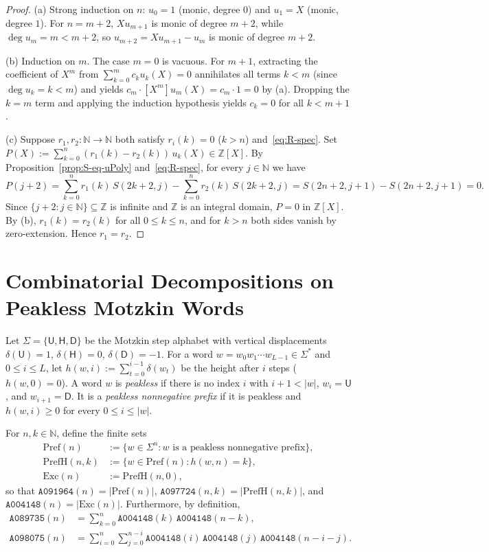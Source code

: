\documentclass[11pt]{article}
\theoremstyle{definition}
\newcommand{\N}{\mathbb{N}}
\newcommand{\Z}{\mathbb{Z}}
\newcommand{\seq}[1]{\texttt{#1}}
\newcommand{\StepU}{\mathsf{U}}
\newcommand{\StepH}{\mathsf{H}}
\newcommand{\StepD}{\mathsf{D}}
\newcommand{\Exc}{\mathrm{Exc}}
\newcommand{\Pref}{\mathrm{Pref}}
\newcommand{\PrefH}{\mathrm{PrefH}}
\begin{document}
\begin{proof}
(a) Strong induction on $n$: $u_0 = 1$ (monic, degree $0$) and $u_1 = X$ (monic, degree $1$). For $n = m + 2$, $X u_{m+1}$ is monic of degree $m + 2$, while $\deg u_m = m < m + 2$, so $u_{m+2} = X u_{m+1} - u_m$ is monic of degree $m + 2$.

(b) Induction on $m$. The case $m = 0$ is vacuous. For $m + 1$, extracting the coefficient of $X^m$ from $\sum_{k=0}^{m} c_k u_k(X) = 0$ annihilates all terms $k < m$ (since $\deg u_k = k < m$) and yields $c_m \cdot [X^m]u_m(X) = c_m \cdot 1 = 0$ by (a). Dropping the $k = m$ term and applying the induction hypothesis yields $c_k = 0$ for all $k < m + 1$.

(c) Suppose $r_1, r_2 : \N \to \N$ both satisfy $r_i(k) = 0$ ($k > n$) and~\eqref{eq:R-spec}. Set $P(X) := \sum_{k=0}^n (r_1(k) - r_2(k))\,u_k(X) \in \Z[X]$. By Proposition~\ref{prop:S-eq-uPoly} and~\eqref{eq:R-spec}, for every $j \in \N$ we have
\[
P(j + 2) = \sum_{k=0}^n r_1(k)\,S(2k + 2, j) - \sum_{k=0}^n r_2(k)\,S(2k + 2, j) = S(2n+2, j+1) - S(2n+2, j+1) = 0.
\]
Since $\{j + 2 : j \in \N\} \subseteq \Z$ is infinite and $\Z$ is an integral domain, $P = 0$ in $\Z[X]$. By (b), $r_1(k) = r_2(k)$ for all $0 \le k \le n$, and for $k > n$ both sides vanish by zero-extension. Hence $r_1 = r_2$.
\end{proof}

\section{Combinatorial Decompositions on Peakless Motzkin Words}

Let $\Sigma = \{\StepU, \StepH, \StepD\}$ be the Motzkin step alphabet with vertical displacements $\delta(\StepU) = 1$, $\delta(\StepH) = 0$, $\delta(\StepD) = -1$. For a word $w = w_0 w_1 \cdots w_{L-1} \in \Sigma^*$ and $0 \le i \le L$, let $h(w, i) := \sum_{t=0}^{i-1} \delta(w_t)$ be the height after $i$ steps ($h(w, 0) = 0$). A word $w$ is \emph{peakless} if there is no index $i$ with $i + 1 < |w|$, $w_i = \StepU$, and $w_{i+1} = \StepD$. It is a \emph{peakless nonnegative prefix} if it is peakless and $h(w, i) \ge 0$ for every $0 \le i \le |w|$.

For $n, k \in \N$, define the finite sets
\begin{align*}
\Pref(n) &:= \{w \in \Sigma^n : w \text{ is a peakless nonnegative prefix}\}, \\
\PrefH(n, k) &:= \{w \in \Pref(n) : h(w, n) = k\}, \\
\Exc(n) &:= \PrefH(n, 0),
\end{align*}
so that $\seq{A091964}(n) = |\Pref(n)|$, $\seq{A097724}(n, k) = |\PrefH(n, k)|$, and $\seq{A004148}(n) = |\Exc(n)|$. Furthermore, by definition,
\begin{align*}
\seq{A089735}(n) &= \sum_{k=0}^{n} \seq{A004148}(k)\,\seq{A004148}(n - k), \\
\seq{A098075}(n) &= \sum_{i=0}^{n}\sum_{j=0}^{n-i} \seq{A004148}(i)\,\seq{A004148}(j)\,\seq{A004148}(n - i - j).
\end{align*}
\end{document}

